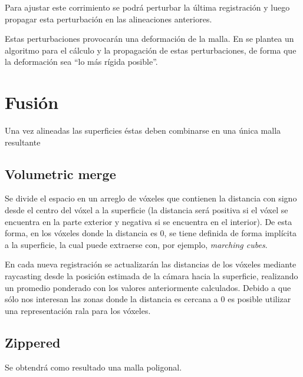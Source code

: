 			Para ajustar este corrimiento se podrá perturbar la última
			registración y luego propagar esta perturbación en las alineaciones
			anteriores.

			Estas perturbaciones provocarán una deformación de la malla.
			En \cite{5457479}
			se plantea un algoritmo para el cálculo
			y la propagación de estas perturbaciones, de forma que la deformación sea ``lo más rígida posible''.

	\section{Fusión}
		Una vez alineadas las superficies éstas deben combinarse en una única malla resultante

		\subsection{Volumetric merge}
		Se divide el espacio en un arreglo de vóxeles que contienen la
		distancia con signo desde el centro del vóxel a la superficie (la
		distancia será positiva si el vóxel se encuentra en la parte exterior y
		negativa si se encuentra en el interior). De esta forma, en los vóxeles
		donde la distancia es 0, se tiene definida de forma implícita a la
		superficie, la cual puede extraerse con, por ejemplo, \emph{marching cubes}.

		En cada nueva registración se actualizarán las distancias de los
		vóxeles mediante raycasting
		desde la posición estimada de la cámara hacia la superficie,
		realizando un promedio ponderado con los valores anteriormente calculados.\cite{Curless:1996:VMB:237170.237269} %
		Debido a que sólo nos interesan las zonas donde la distancia es cercana a 0 es posible utilizar una representación rala para los vóxeles.\cite{Steinbrucker:2013:LMS:2586117.2586926} %


		\subsection{Zippered}
		Se obtendrá como resultado una malla poligonal.

